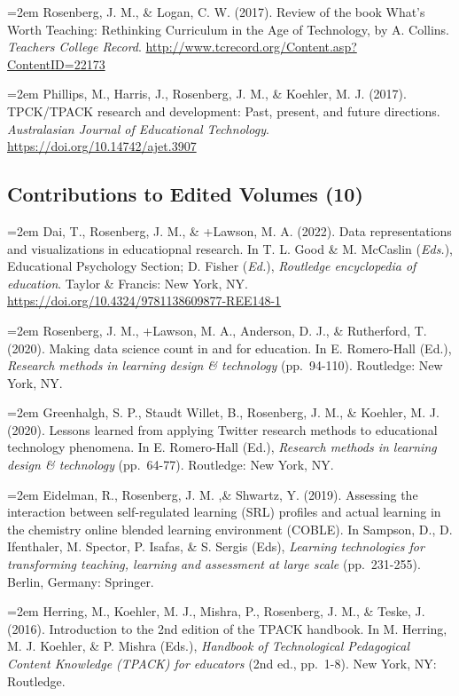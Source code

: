 \documentclass[
  14,
]{article}
\begin{document}
\hangindent=2em Rosenberg, J. M., \& Logan, C. W. (2017). Review of the
book What's Worth Teaching: Rethinking Curriculum in the Age of
Technology, by A. Collins. \emph{Teachers College Record}.
\url{http://www.tcrecord.org/Content.asp?ContentID=22173}

\hangindent=2em Phillips, M., Harris, J., Rosenberg, J. M., \& Koehler,
M. J. (2017). TPCK/TPACK research and development: Past, present, and
future directions. \emph{Australasian Journal of Educational
Technology}. \url{https://doi.org/10.14742/ajet.3907}

\hypertarget{contributions-to-edited-volumes-10}{%
\subsection{Contributions to Edited Volumes
(10)}\label{contributions-to-edited-volumes-10}}

\hangindent=2em Dai, T., Rosenberg, J. M., \& +Lawson, M. A. (2022).
Data representations and visualizations in educatiopnal research. In T.
L. Good \& M. McCaslin (\emph{Eds.}), Educational Psychology Section; D.
Fisher (\emph{Ed.}), \emph{Routledge encyclopedia of education}. Taylor
\& Francis: New York, NY.
\url{https://doi.org/10.4324/9781138609877-REE148-1}

\hangindent=2em Rosenberg, J. M., +Lawson, M. A., Anderson, D. J., \&
Rutherford, T. (2020). Making data science count in and for education.
In E. Romero-Hall (Ed.), \emph{Research methods in learning design \&
technology} (pp.~94-110). Routledge: New York, NY.

\hangindent=2em Greenhalgh, S. P., Staudt Willet, B., Rosenberg, J. M.,
\& Koehler, M. J. (2020). Lessons learned from applying Twitter research
methods to educational technology phenomena. In E. Romero-Hall (Ed.),
\emph{Research methods in learning design \& technology} (pp.~64-77).
Routledge: New York, NY.

\hangindent=2em Eidelman, R., Rosenberg, J. M. ,\& Shwartz, Y. (2019).
Assessing the interaction between self-regulated learning (SRL) profiles
and actual learning in the chemistry online blended learning environment
(COBLE). In Sampson, D., D. Ifenthaler, M. Spector, P. Isafas, \& S.
Sergis (Eds), \emph{Learning technologies for transforming teaching,
learning and assessment at large scale} (pp.~231-255). Berlin, Germany:
Springer.

\hangindent=2em Herring, M., Koehler, M. J., Mishra, P., Rosenberg, J.
M., \& Teske, J. (2016). Introduction to the 2nd edition of the TPACK
handbook. In M. Herring, M. J. Koehler, \& P. Mishra (Eds.),
\emph{Handbook of Technological Pedagogical Content Knowledge (TPACK)
for educators} (2nd ed., pp.~1-8). New York, NY: Routledge.
\end{document}
